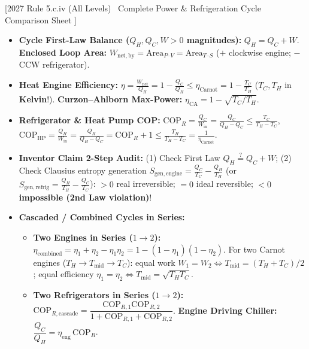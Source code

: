 \documentclass[10pt,twoside,openany,letterpaper]{book}
\begin{document}
\begin{quicksheet}\label{qr:09}
[2027 Rule 5.c.iv (All Levels) \textbar\ Complete Power \& Refrigeration Cycle Comparison Sheet ]

\begin{formulacard}
\scriptsize
\begin{itemize}
  \item \textbf{Cycle First-Law Balance ($Q_H, Q_C, W > 0$ magnitudes):} $\boxed{Q_H = Q_C + W}$. \textbf{Enclosed Loop Area:} $W_{\mathrm{net,by}} = \mathrm{Area}_{P\text{--}V} = \mathrm{Area}_{T\text{--}S}$ ($+$ clockwise engine; $-$ CCW refrigerator).
  \item \textbf{Heat Engine Efficiency:} $\displaystyle \boxed{\eta = \frac{W_{\mathrm{net}}}{Q_H} = 1 - \frac{Q_C}{Q_H} \le \eta_{\mathrm{Carnot}} = 1 - \frac{T_C}{T_H}}$ ($T_C, T_H$ in \textbf{Kelvin}!). \textbf{Curzon--Ahlborn Max-Power:} $\eta_{\mathrm{CA}} = 1 - \sqrt{T_C/T_H}$.
  \item \textbf{Refrigerator \& Heat Pump COP:} $\displaystyle \boxed{\mathrm{COP}_R = \frac{Q_C}{W_{\mathrm{in}}} = \frac{Q_C}{Q_H - Q_C} \le \frac{T_C}{T_H - T_C}}$, $\displaystyle \boxed{\mathrm{COP}_{\mathrm{HP}} = \frac{Q_H}{W_{\mathrm{in}}} = \frac{Q_H}{Q_H - Q_C} = \mathrm{COP}_R + 1 \le \frac{T_H}{T_H - T_C} = \frac{1}{\eta_{\mathrm{Carnot}}}}$.
  \item \textbf{Inventor Claim 2-Step Audit:} (1) Check First Law $Q_H \stackrel{?}{=} Q_C + W$; (2) Check Clausius entropy generation $S_{\mathrm{gen,engine}} = \frac{Q_C}{T_C} - \frac{Q_H}{T_H}$ (or $S_{\mathrm{gen,refrig}} = \frac{Q_H}{T_H} - \frac{Q_C}{T_C}$): $>0$ real irreversible; $=0$ ideal reversible; $<0$ \textbf{impossible (2nd Law violation)}!
  \item \textbf{Cascaded / Combined Cycles in Series:}
  \begin{itemize}
    \item \textbf{Two Engines in Series ($1\to 2$):} $\boxed{\eta_{\mathrm{combined}} = \eta_1 + \eta_2 - \eta_1\eta_2 = 1 - (1 - \eta_1)(1 - \eta_2)}$. For two Carnot engines ($T_H \to T_{\mathrm{mid}} \to T_C$): equal work $W_1 = W_2 \iff \boxed{T_{\mathrm{mid}} = (T_H + T_C)/2}$; equal efficiency $\eta_1 = \eta_2 \iff \boxed{T_{\mathrm{mid}} = \sqrt{T_H T_C}}$.
    \item \textbf{Two Refrigerators in Series ($1\to 2$):} $\boxed{\mathrm{COP}_{R,\mathrm{cascade}} = \dfrac{\mathrm{COP}_{R,1}\mathrm{COP}_{R,2}}{1 + \mathrm{COP}_{R,1} + \mathrm{COP}_{R,2}}}$. \textbf{Engine Driving Chiller:} $\dfrac{Q_C}{Q_H} = \eta_{\mathrm{eng}}\,\mathrm{COP}_R$.
  \end{itemize}
\end{itemize}
\end{formulacard}


\end{quicksheet}
\end{document}
